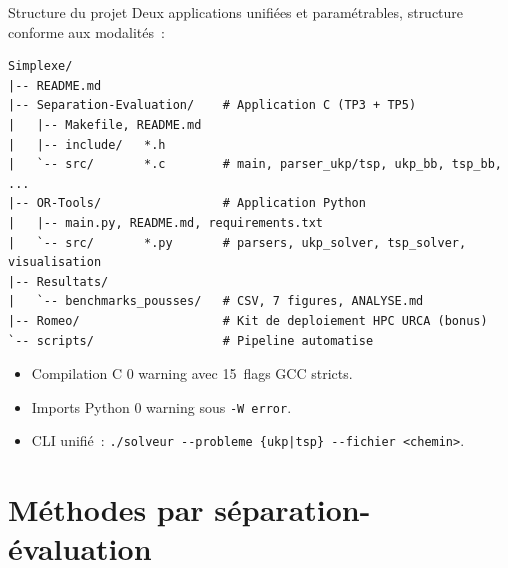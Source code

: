 \documentclass[aspectratio=169, 11pt]{beamer}
\begin{document}
\begin{frame}[fragile]{Structure du projet}
Deux applications \alert{unifiées et paramétrables}, structure conforme aux modalités~:

\begin{lstlisting}[basicstyle=\ttfamily\tiny]
Simplexe/
|-- README.md
|-- Separation-Evaluation/    # Application C (TP3 + TP5)
|   |-- Makefile, README.md
|   |-- include/   *.h
|   `-- src/       *.c        # main, parser_ukp/tsp, ukp_bb, tsp_bb, ...
|-- OR-Tools/                 # Application Python
|   |-- main.py, README.md, requirements.txt
|   `-- src/       *.py       # parsers, ukp_solver, tsp_solver, visualisation
|-- Resultats/
|   `-- benchmarks_pousses/   # CSV, 7 figures, ANALYSE.md
|-- Romeo/                    # Kit de deploiement HPC URCA (bonus)
`-- scripts/                  # Pipeline automatise
\end{lstlisting}

\begin{itemize}
  \item Compilation C \alert{0 warning} avec 15~flags GCC stricts.
  \item Imports Python \alert{0 warning} sous \texttt{-W~error}.
  \item CLI unifié~: \texttt{./solveur -{}-probleme \{ukp|tsp\} -{}-fichier <chemin>}.
\end{itemize}
\end{frame}

\section{Méthodes par séparation-évaluation}
\end{document}
